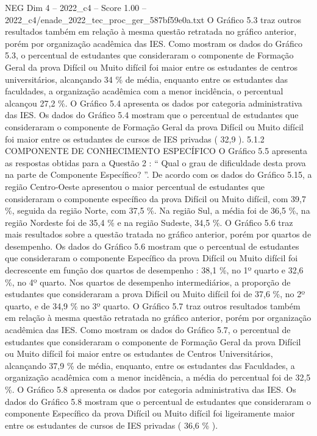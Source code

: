 \begin{textsample}{NEG Dim 4 – 2022\_c4 – Score 1.00 – 2022\_c4/enade\_2022\_tec\_proc\_ger\_587bf59e0a.txt}
O Gráfico 5.3 traz outros resultados também em relação à mesma questão retratada no gráfico anterior, porém por organização acadêmica das IES.
Como mostram os dados do Gráfico 5.3, o percentual de estudantes que consideraram o componente de Formação Geral da prova Difícil ou Muito difícil foi maior entre os estudantes de centros universitários, alcançando 34 \% de média, enquanto entre os estudantes das faculdades, a organização acadêmica com a menor incidência, o percentual alcançou 27,2 \%.
O Gráfico 5.4 apresenta os dados por categoria administrativa das IES.
Os dados do Gráfico 5.4 mostram que o percentual de estudantes que consideraram o componente de Formação Geral da prova Difícil ou Muito difícil foi maior entre os estudantes de cursos de IES privadas ( 32,9 ). 5.1.2 COMPONENTE DE CONHECIMENTO ESPECÍFICO O Gráfico 5.5 apresenta as respostas obtidas para a Questão 2 : “ Qual o grau de dificuldade desta prova na parte de Componente Específico? ”.
De acordo com os dados do Gráfico 5.15, a região Centro-Oeste apresentou o maior percentual de estudantes que consideraram o componente específico da prova Difícil ou Muito difícil, com 39,7 \%, seguida da região Norte, com 37,5 \%.
Na região Sul, a média foi de 36,5 \%, na região Nordeste foi de 35,4 \% e na região Sudeste, 34,5 \%.
O Gráfico 5.6 traz mais resultados sobre a questão tratada no gráfico anterior, porém por quartos de desempenho.
Os dados do Gráfico 5.6 mostram que o percentual de estudantes que consideraram o componente Específico da prova Difícil ou Muito difícil foi decrescente em função dos quartos de desempenho : 38,1 \%, no 1º quarto e 32,6 \%, no 4º quarto.
Nos quartos de desempenho intermediários, a proporção de estudantes que consideraram a prova Difícil ou Muito difícil foi de 37,6 \%, no 2º quarto, e de 34,9 \% no 3º quarto.
O Gráfico 5.7 traz outros resultados também em relação à mesma questão retratada no gráfico anterior, porém por organização acadêmica das IES.
Como mostram os dados do Gráfico 5.7, o percentual de estudantes que consideraram o componente de Formação Geral da prova Difícil ou Muito difícil foi maior entre os estudantes de Centros Universitários, alcançando 37,9 \% de média, enquanto, entre os estudantes das Faculdades, a organização acadêmica com a menor incidência, a média do percentual foi de 32,5 \%.
O Gráfico 5.8 apresenta os dados por categoria administrativa das IES.
Os dados do Gráfico 5.8 mostram que o percentual de estudantes que consideraram o componente Específico da prova Difícil ou Muito difícil foi ligeiramente maior entre os estudantes de cursos de IES privadas ( 36,6 \% ).

\end{textsample}
